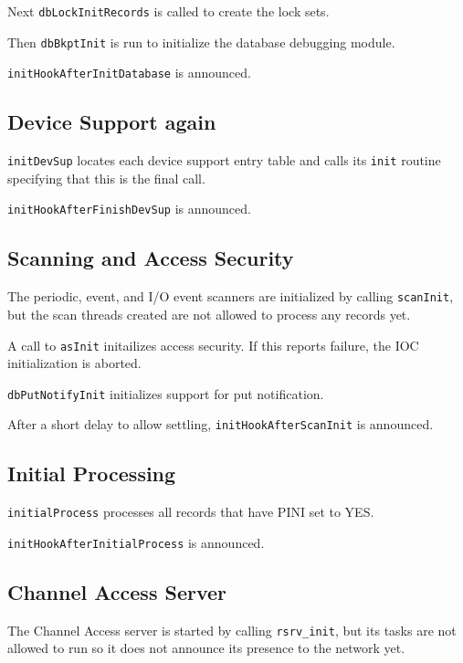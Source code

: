 Next \verb|dbLockInitRecords| is called to create the lock sets.

Then \verb|dbBkptInit| is run to initialize the database debugging module.

\verb|initHookAfterInitDatabase| is announced.

\subsection{Device Support again}

\verb|initDevSup| locates each device support entry table and calls its \verb|init| routine specifying that this is the final call.

\verb|initHookAfterFinishDevSup| is announced.

\subsection{Scanning and Access Security}

The periodic, event, and I/O event scanners are initialized by calling \verb|scanInit|, but the scan threads created are not 
allowed to process any records yet.

A call to \verb|asInit| initailizes access security. If this reports failure, the IOC initialization is aborted.

\verb|dbPutNotifyInit| initializes support for put notification.

After a short delay to allow settling, \verb|initHookAfterScanInit| is announced.

\subsection{Initial Processing}

\verb|initialProcess| processes all records that have PINI set to YES.

\verb|initHookAfterInitialProcess| is announced.

\subsection{Channel Access Server}

The Channel Access server is started by calling \verb|rsrv_init|, but its tasks are not allowed to run so it does not announce 
its presence to the network yet.


